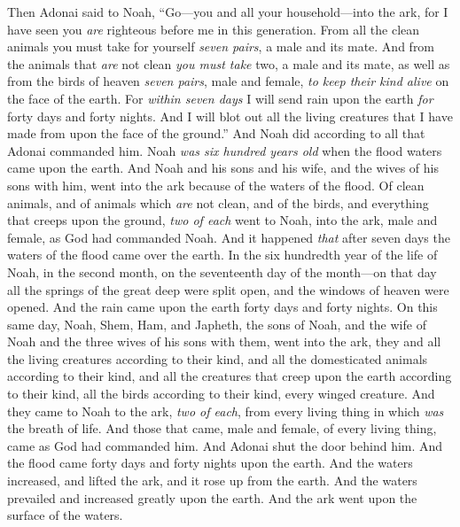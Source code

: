 \begin{biblechapter} %
\verse Then Adonai said to Noah, “Go—you and all your household—into the ark, for I have seen you \textit{are} righteous before me in this generation.
\verse From all the clean animals you must take for yourself \textit{seven pairs}, a male and its mate. And from the animals that \textit{are} not clean \textit{you must take} two, a male and its mate,
\verse as well as from the birds of heaven \textit{seven pairs}, male and female, \textit{to keep their kind alive} on the face of the earth.
\verse For \textit{within seven days} I will send rain upon the earth \textit{for} forty days and forty nights. And I will blot out all the living creatures that I have made from upon the face of the ground.”
\verse And Noah did according to all that Adonai commanded him.
 Noah \textit{was six hundred years old} when the flood waters came upon the earth.
\verse And Noah and his sons and his wife, and the wives of his sons with him, went into the ark because of the waters of the flood.
\verse Of clean animals, and of animals which \textit{are} not clean, and of the birds, and everything that creeps upon the ground,
\verse \textit{two of each} went to Noah, into the ark, male and female, as God had commanded Noah.
\verse And it happened \textit{that} after seven days the waters of the flood came over the earth.
\verse In the six hundredth year of the life of Noah, in the second month, on the seventeenth day of the month—on that day all the springs of the great deep were split open, and the windows of heaven were opened.
\verse And the rain came upon the earth forty days and forty nights.
\verse On this same day, Noah, Shem, Ham, and Japheth, the sons of Noah, and the wife of Noah and the three wives of his sons with them, went into the ark,
\verse they and all the living creatures according to their kind, and all the domesticated animals according to their kind, and all the creatures that creep upon the earth according to their kind, all the birds according to their kind, every winged creature.
\verse And they came to Noah to the ark, \textit{two of each}, from every living thing in which \textit{was} the breath of life.
\verse And those that came, male and female, of every living thing, came as God had commanded him. And Adonai shut the door behind him.
\verse And the flood came forty days and forty nights upon the earth. And the waters increased, and lifted the ark, and it rose up from the earth.
\verse And the waters prevailed and increased greatly upon the earth. And the ark went upon the surface of the waters.

\end{biblechapter}
